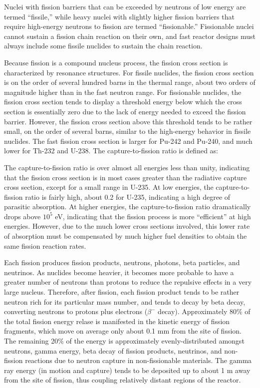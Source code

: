 Nuclei with fission barriers that can be exceeded by neutrons of low energy are termed ``fissile,'' while heavy nuclei with slightly higher fission barriers that require high-energy neutrons to fission are termed ``fissionable.'' Fissionable nuclei cannot sustain a fission chain reaction on their own, and fast reactor designs must always include some fissile nuclides to sustain the chain reaction. %

Because fission is a compound nucleus process, the fission cross section is characterized by resonance structures. For fissile nuclides, the fission cross section is on the order of several hundred barns in the thermal range, about two orders of magnitude higher than in the fast neutron range. For fissionable nuclides, the fission cross section tends to display a threshold energy below which the cross section is essentially zero due to the lack of energy needed to exceed the fission barrier. However, the fission cross section above this threshold tends to be rather small, on the order of several barns, similar to the high-energy behavior in fissile nuclides. The fast fission cross section is larger for Pu-242 and Pu-240, and much lower for Th-232 and U-238. The capture-to-fission ratio is defined as:

\beq
\alpha\equiv{}
\eeq

The capture-to-fission ratio is over almost all energies less than unity, indicating that the fission cross section is in most cases greater than the radiative capture cross section, except for a small range in U-235. At low energies, the capture-to-fission ratio is fairly high, about 0.2 for U-235, indicating a high degree of parasitic absorption. At higher energies, the capture-to-fission ratio dramatically drops above $10^5$ eV, indicating that the fission process is more ``efficient'' at high energies. However, due to the much lower cross sections involved, this lower rate of absorption must be compensated by much higher fuel densities to obtain the same fission reaction rates.

Each fission produces fission products, neutrons, photons, beta particles, and neutrinos. As nuclides become heavier, it becomes more probable to have a greater number of neutrons than protons to reduce the repulsive effects in a very large nucleus. Therefore, after fission, each fission product tends to be rather neutron rich for its particular mass number, and tends to decay by beta decay, converting neutrons to protons plus electrons (\(\beta^-\) decay). Approximately 80\% of the total fission energy relase is manifested in the kinetic energy of fission fragments, which move on average only about 0.1 mm from the site of fission. The remaining 20\% of the energy is approximately evenly-distributed amongst neutrons, gamma energy, beta decay of fission products, neutrinos, and non-fission reactions due to neutron capture in non-fissionable materials. The gamma ray energy (in motion and capture) tends to be deposited up to about 1 m away from the site of fission, thus coupling relatively distant regions of the reactor.

